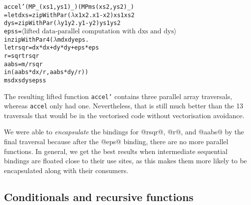 % 

\begin{small}
\begin{alltt}
 accel' (MP _ (xs1, ys1) _) (MP ms (xs2, ys2) _)
   = let dxs   = zipWithPar (\(\lambda\)x1 x2. x1 - x2) xs1 xs2 
         dys   = zipWithPar (\(\lambda\)y1 y2. y1 - y2) ys1 ys2
         epss  = \(\langle\textrm{lifted data-parallel computation with dxs and dys}\rangle\) 
     in  zipWithPar4 (\(\lambda\)m dx dy eps. 
           let rsqr = dx * dx + dy * dy + eps * eps
               r    = sqrt rsqr
               aabs = m / rsqr
           in  (aabs * dx / r, aabs * dy / r))
           ms dxs dys epss
\end{alltt}
\end{small}
%
The resulting lifted function \texttt{accel'} contains three parallel array traversals, whereas \texttt{accel} only had one. Nevertheless, that is still much better than the 13 traversals that would be in the vectorised code without vectorisation avoidance.

We were able to \emph{encapsulate} the bindings for @rsqr@, @r@, and @aabs@ by the final traversal because after the @eps@ binding, there are no more parallel functions. In general, we get the best results when intermediate sequential bindings are floated close to their use sites, as this makes them more likely to be encapsulated along with their consumers.


\subsection{Conditionals and recursive functions}
\label{sec:conditionals}

